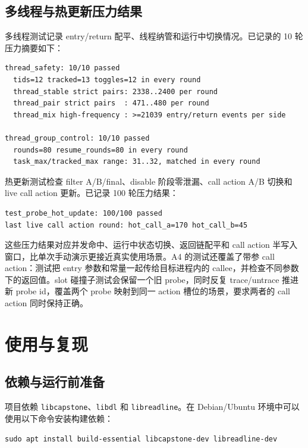 \documentclass[UTF8,a4paper,11pt,fontset=fandol]{ctexart}
\newcommand{\code}[1]{\texttt{#1}}
\begin{document}
\subsection{多线程与热更新压力结果}

多线程测试记录 entry/return 配平、线程纳管和运行中切换情况。已记录的 10 轮压力摘要如下：

\begin{lstlisting}
thread_safety: 10/10 passed
  tids=12 tracked=13 toggles=12 in every round
  thread_stable strict pairs: 2338..2400 per round
  thread_pair strict pairs  : 471..480 per round
  thread_mix high-frequency : >=21039 entry/return events per side

thread_group_control: 10/10 passed
  rounds=80 resume_rounds=80 in every round
  task_max/tracked_max range: 31..32, matched in every round
\end{lstlisting}

热更新测试检查 filter A/B/final、disable 阶段零泄漏、call action A/B 切换和 live call action 更新。已记录 100 轮压力结果：

\begin{lstlisting}
test_probe_hot_update: 100/100 passed
last live call action round: hot_call_a=170 hot_call_b=45
\end{lstlisting}

这些压力结果对应并发命中、运行中状态切换、返回链配平和 call action 半写入窗口，比单次手动演示更接近真实使用场景。A4 的测试还覆盖了带参 call action：测试把 entry 参数和常量一起传给目标进程内的 callee，并检查不同参数下的返回值。slot 碰撞子测试会保留一个旧 probe，同时反复 trace/untrace 推进新 probe id，覆盖两个 probe 映射到同一 action 槽位的场景，要求两者的 call action 同时保持正确。

\section{使用与复现}

\subsection{依赖与运行前准备}

项目依赖 \code{libcapstone}、\code{libdl} 和 \code{libreadline}。在 Debian/Ubuntu 环境中可以使用以下命令安装构建依赖：

\begin{lstlisting}
sudo apt install build-essential libcapstone-dev libreadline-dev
\end{lstlisting}
\end{document}
